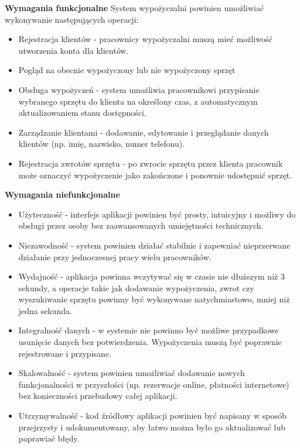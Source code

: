 \noindent \textbf{Wymagania funkcjonalne}
\newline \noindent System wypożyczalni powinien umożliwiać wykonywanie następujących operacji:
\begin{itemize}
    \item Rejestracja klientów - pracownicy wypożyczalni muszą mieć możliwość utworzenia konta dla klientów.
    \item Pogląd na obecnie wypożyczony lub nie wypożyczony sprzęt
    \item Obsługa wypożyczeń - system umożliwia pracownikowi przypisanie wybranego sprzętu do klienta na określony czas, z automatycznym aktualizowaniem stanu dostępności. 
    \item Zarządzanie klientami - dodawanie, edytowanie i przeglądanie danych klientów (np. imię, nazwisko, numer telefonu).
    \item Rejestracja zwrotów sprzętu - po zwrocie sprzętu przez klienta pracownik może oznaczyć wypożyczenie jako zakończone i ponownie udostępnić sprzęt.
\end{itemize}

\noindent \textbf{Wymagania niefunkcjonalne}
\begin{itemize}
    \item Użyteczność - interfejs aplikacji powinien być prosty, intuicyjny i możliwy do obsługi przez osoby bez zaawansowanych umiejętności technicznych.
    \item Niezawodność - system powinien działać stabilnie i zapewniać nieprzerwane działanie przy jednoczesnej pracy wielu pracowników.
    \item Wydajność - aplikacja powinna wczytywać się w czasie nie dłuższym niż 3 sekundy, a operacje takie jak dodawanie wypożyczenia, zwrot czy wyszukiwanie sprzętu powinny być wykonywane natychmiastowo, mniej niż jedna sekunda.
    \item Integralność danych - w systemie nie powinno być możliwe przypadkowe usunięcie danych bez potwierdzenia. Wypożyczenia muszą być poprawnie rejestrowane i przypisane. 
    \item Skalowalność - system powinien umożliwiać dodawanie nowych funkcjonalności w przyszłości (np. rezerwacje online, płatności internetowe) bez konieczności przebudowy całej aplikacji.
    \item Utrzymywalność - kod źródłowy aplikacji powinien być napisany w sposób przejrzysty i udokumentowany, aby łatwo można było go aktualizować lub poprawiać błędy.
\end{itemize}
 
